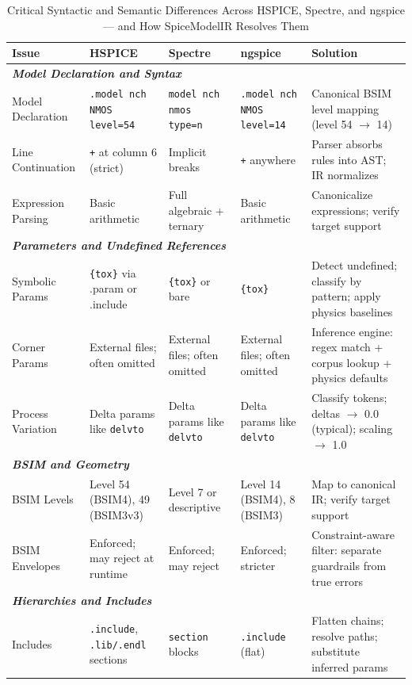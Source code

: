 \documentclass[conference]{IEEEtran}
\begin{document}
\begin{table}[!t]
\caption{Critical Syntactic and Semantic Differences Across HSPICE, Spectre, and ngspice --- and How SpiceModelIR Resolves Them}
\label{tab:critical_diffs}
\centering
\renewcommand{\arraystretch}{1.15}
\footnotesize
\begin{tabular}{@{}p{1.6cm}p{2.0cm}p{2.0cm}p{2.0cm}p{3.0cm}@{}}
\toprule
\textbf{Issue} & \textbf{HSPICE} & \textbf{Spectre} & \textbf{ngspice} & \textbf{Solution} \\
\midrule
\multicolumn{5}{l}{\textit{\textbf{Model Declaration and Syntax}}} \\
\midrule
Model Declaration & \texttt{.model nch NMOS level=54} & \texttt{model nch nmos type=n} & \texttt{.model nch NMOS level=14} & Canonical BSIM level mapping (level 54 $\rightarrow$ 14) \\
Line Continuation & \texttt{+} at column 6 (strict) & Implicit breaks & \texttt{+} anywhere & Parser absorbs rules into AST; IR normalizes \\
Expression Parsing & Basic arithmetic & Full algebraic + ternary & Basic arithmetic & Canonicalize expressions; verify target support \\
\midrule
\multicolumn{5}{l}{\textit{\textbf{Parameters and Undefined References}}} \\
\midrule
Symbolic Params & \texttt{\{tox\}} via .param or .include & \texttt{\{tox\}} or bare & \texttt{\{tox\}} & Detect undefined; classify by pattern; apply physics baselines \\
Corner Params & External files; often omitted & External files; often omitted & External files; often omitted & Inference engine: regex match + corpus lookup + physics defaults \\
Process Variation & Delta params like \texttt{delvto} & Delta params like \texttt{delvto} & Delta params like \texttt{delvto} & Classify tokens; deltas $\rightarrow$ 0.0 (typical); scaling $\rightarrow$ 1.0 \\
\midrule
\multicolumn{5}{l}{\textit{\textbf{BSIM and Geometry}}} \\
\midrule
BSIM Levels & Level 54 (BSIM4), 49 (BSIM3v3) & Level 7 or descriptive & Level 14 (BSIM4), 8 (BSIM3) & Map to canonical IR; verify target support \\
BSIM Envelopes & Enforced; may reject at runtime & Enforced; may reject & Enforced; stricter & Constraint-aware filter: separate guardrails from true errors \\
\midrule
\multicolumn{5}{l}{\textit{\textbf{Hierarchies and Includes}}} \\
\midrule
Includes & \texttt{.include}, \texttt{.lib/.endl} sections & \texttt{section} blocks & \texttt{.include} (flat) & Flatten chains; resolve paths; substitute inferred params \\
\bottomrule
\end{tabular}
\end{table}
\end{document}
